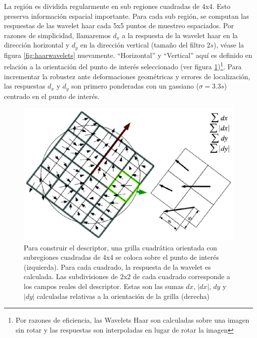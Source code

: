 La región es dividida regularmente en sub regiones cuadradas de 4x4. Esto preserva información espacial importante. Para cada sub región, se computan las respuestas de las wavelet haar cada 5x5 puntos de muestreo espaciados. Por razones de simplicidad, llamaremos $d_x$ a la respuesta de la wavelet haar en la dirección horizontal y $d_y$ en la dirección vertical (tamaño del filtro $2s$), véase la figura \ref{fig:haarwavelets} nuevamente. ``Horizontal'' y ``Vertical'' aquí es definido en relación a la orientación del punto de interés seleccionado (ver figura \ref{fig:subdivideregions})\footnote{Por razones de eficiencia, las Wavelets Haar son calculadas sobre una imagen sin rotar y las respuestas son interpoladas en lugar de rotar la imagen}. Para incrementar la robustez ante deformaciones geométricas y errores de localización, las respuestas $d_x$ y $d_y$ son primero ponderadas con un gassiano ($\sigma=3.3s$) centrado en el punto de interés.


\begin{figure}[tbhp]
   \centering
        \includegraphics[scale=0.4]{./figs/subdivideregions}
    \caption[]{Para construir el descriptor, una grilla cuadrática orientada con subregiones cuadradas de 4x4 se coloca sobre el punto de interés (izquierda). Para cada cuadrado, la respuesta de la wavelet es calculada. Las subdivisiones de 2x2 de cada cuadrado corresponde a los campos reales del descriptor. Estas son las sumas $dx$, $|dx|$, $dy$ y $|dy|$ calculadas relativas a la orientación de la grilla (derecha)}
   \label{fig:subdivideregions}                %
\end{figure}

